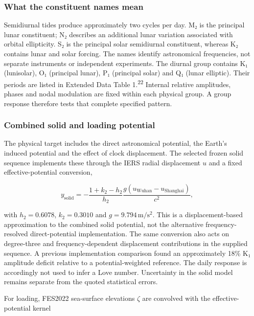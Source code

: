 \documentclass[
  12pt,
  a4paper,
]{article}
\begin{document}
\hypertarget{what-the-constituent-names-mean}{%
\subsubsection{What the constituent names
mean}\label{what-the-constituent-names-mean}}

Semidiurnal tides produce approximately two cycles per day. M₂ is the
principal lunar constituent; N₂ describes an additional lunar variation
associated with orbital ellipticity. S₂ is the principal solar
semidiurnal constituent, whereas K₂ contains lunar and solar forcing.
The names identify astronomical frequencies, not separate instruments or
independent experiments. The diurnal group contains K₁ (lunisolar), O₁
(principal lunar), P₁ (principal solar) and Q₁ (lunar elliptic). Their
periods are listed in Extended Data Table 1.\textsuperscript{22}
Internal relative amplitudes, phases and nodal modulation are fixed
within each physical group. A group response therefore tests that
complete specified pattern.

\hypertarget{combined-solid-and-loading-potential}{%
\subsubsection{Combined solid and loading
potential}\label{combined-solid-and-loading-potential}}

The physical target includes the direct astronomical potential, the
Earth's induced potential and the effect of clock displacement. The
selected frozen solid sequence implements these through the IERS radial
displacement \(u\) and a fixed effective-potential conversion,

\[y_{\mathrm{solid}}=-\frac{1+k_2-h_2}{h_2}\frac{g(u_{\mathrm{Wuhan}}-u_{\mathrm{Shanghai}})}{c^2},\]

with \(h_2=0.6078\), \(k_2=0.3010\) and \(g=9.794\,\mathrm{m/s^2}\).
This is a displacement-based approximation to the combined solid
potential, not the alternative frequency-resolved direct-potential
implementation. The same conversion also acts on degree-three and
frequency-dependent displacement contributions in the supplied sequence.
A previous implementation comparison found an approximately 18\% K₁
amplitude deficit relative to a potential-weighted reference. The daily
response is accordingly not used to infer a Love number. Uncertainty in
the solid model remains separate from the quoted statistical errors.

For loading, FES2022 sea-surface elevations \(\zeta\) are convolved with
the effective-potential kernel
\end{document}
